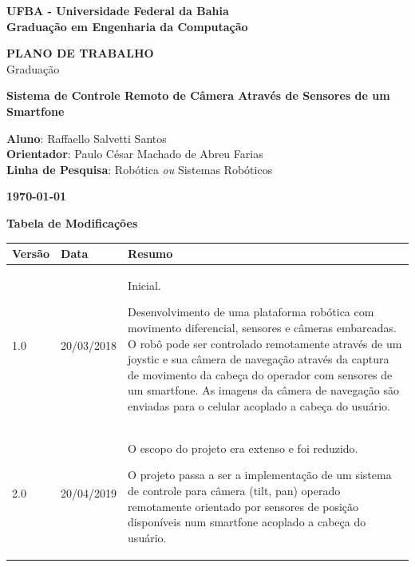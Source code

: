 \documentclass[12pt,a4paper]{article}
\begin{document}

\begin{titlepage}
\thispagestyle{empty}
\begin{center}
\large{\bf{UFBA - Universidade Federal da Bahia}} \\
\large{\bf{Graduação em Engenharia da Computação}} \\
\end{center}
\vfill

\centering
\textbf{{\LARGE PLANO DE TRABALHO}}  \\ \vspace{0.5cm}
{\LARGE Graduação}
\vfill




\textbf{{\Large Sistema de Controle Remoto de Câmera Através de Sensores de um Smartfone}} \\ %
\vfill
\begin{flushleft}
\textbf{Aluno}: Raffaello Salvetti Santos \hfill{}\\
\textbf{Orientador}: Paulo César Machado de Abreu Farias\hfill{}\\
\textbf{Linha de Pesquisa}: Robótica {\it ou} Sistemas Robóticos \hfill{}\\
\end{flushleft}

\vfill


\begin{center}
\large{\bf{\today}}
\end{center}
\end{titlepage}



\pagebreak
\begin{center}
\Large{\bf{Tabela de Modificações}}
\end{center}

\begin{center}
    \begin{tabular}{ | l | l | p{10cm} |}
    \hline
    Versão & Data & Resumo \\ \hline
    1.0 & 20/03/2018 & Inicial.\par Desenvolvimento de uma plataforma robótica com movimento diferencial, sensores e câmeras embarcadas. O robô pode ser controlado remotamente através de um joystic e sua câmera de navegação através da captura de movimento da cabeça do operador com sensores de um smartfone. As imagens da câmera de navegação são enviadas para o celular acoplado a cabeça do usuário.\\ \hline
    2.0 & 20/04/2019 & O escopo do projeto era extenso e foi reduzido.\par O projeto passa a ser a implementação de um sistema de controle para câmera (tilt, pan) operado remotamente orientado por sensores de posição disponíveis num smartfone acoplado a cabeça do usuário. \\ \hline
    \end{tabular}
\end{center}
\end{document}
